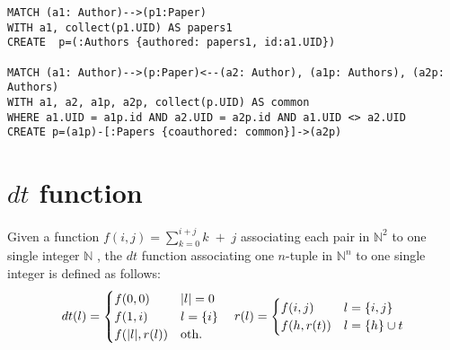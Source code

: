 \begin{lstlisting}[caption={Graph Nesting in Neo4J using Cypher as a Query Language. Please note that the nested vertices must be created before creating the nested edges.},language=Cypher,frameround=fttt,frame=trBL,mathescape=true,label=Neo4JQuery]
MATCH (a1: Author)-->(p1:Paper) 
WITH a1, collect(p1.UID) AS papers1 
CREATE  p=(:Authors {authored: papers1, id:a1.UID})

MATCH (a1: Author)-->(p:Paper)<--(a2: Author), (a1p: Authors), (a2p: Authors)
WITH a1, a2, a1p, a2p, collect(p.UID) AS common
WHERE a1.UID = a1p.id AND a2.UID = a2p.id AND a1.UID <> a2.UID
CREATE p=(a1p)-[:Papers {coauthored: common}]->(a2p)
\end{lstlisting}

\section{$dt$ function}
Given a function $f(i,j)=\sum_{k=0}^{i+j}k\;+\;j$ associating each pair in $\mathbb{N}^2$ to one single integer $\mathbb{N}$ \cite{odifreddi1992},
the $dt$ function associating one $n$-tuple in $\mathbb{N}^n$ to one single integer is defined as follows:
	\[dt(l)=\begin{cases}
f(0,0) & |l| = 0\\
f(1,i) & l=\{i\}\\
f(|l|,r(l)) & \textup{oth.}\\  
\end{cases}\quad r(l)=\begin{cases}
f(i,j) & l = \{i,j\}\\
f(h,r(t)) & l = \{h\}\cup t\\
\end{cases}\]


%
